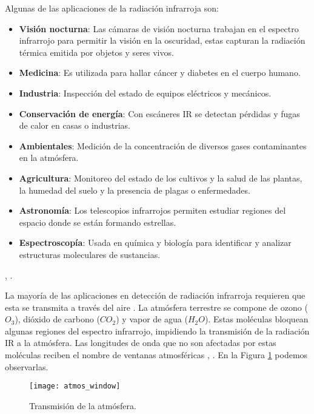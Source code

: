 Algunas de las aplicaciones de la radiación infrarroja son:
			\begin{itemize}
				\item \textbf{Visión nocturna}: Las cámaras de visión nocturna trabajan en el espectro infrarrojo para permitir la visión en la oscuridad, estas capturan la radiación térmica emitida por objetos y seres vivos.
				\item \textbf{Medicina}: Es utilizada para hallar cáncer y diabetes en el cuerpo humano.
				\item \textbf{Industria}: Inspección del estado de equipos eléctricos y mecánicos.
				\item \textbf{Conservación de energía}: Con escáneres IR se detectan pérdidas y fugas de calor en casas o industrias.
				\item \textbf{Ambientales}: Medición de la concentración de diversos gases contaminantes en la atmósfera.
				\item \textbf{Agricultura}: Monitoreo del estado de los cultivos y la salud de las plantas, la humedad del suelo y la presencia de plagas o enfermedades.
				\item \textbf{Astronomía}: Los telescopios infrarrojos permiten estudiar regiones del espacio donde se están formando estrellas.
				\item \textbf{Espectroscopía}: Usada en química y biología para identificar y analizar estructuras moleculares de sustancias.		
			\end{itemize}
\cite{Rogalski}, \cite{BlancoMDA}.

La mayoría de las aplicaciones en detección de radiación infrarroja requieren que esta se transmita a través del aire \cite{Jimenez}. La atmósfera terrestre se compone de ozono ($O_{3}$), dióxido de carbono ($CO_{2}$) y vapor de agua ($H_{2}O$). Estas moléculas bloquean algunas regiones del espectro infrarrojo, impidiendo la transmisión de la radiación IR a la atmósfera. Las longitudes de onda que no son afectadas por estas moléculas reciben el nombre de ventanas atmosféricas \cite{Rogalski}, \cite{Motilal}. En la Figura \ref{fig:atmos_window} podemos observarlas.

            \begin{figure}[hbtp]
                \centering
                \texttt{[image: atmos\_window]}
                \caption{Transmisión de la atmósfera.}
                \label{fig:atmos_window}
            \end{figure}




